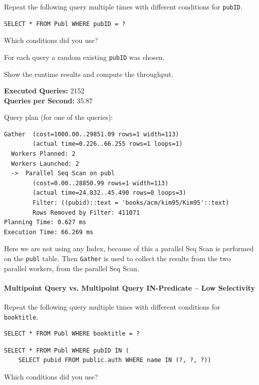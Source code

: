 \documentclass[11pt]{scrartcl}
\begin{document}
Repeat the following query multiple times with different conditions for \texttt{pubID}.

\begin{lstlisting}[style=dbtsql]
SELECT * FROM Publ WHERE pubID = ?
\end{lstlisting}

Which conditions did you use?

For each query a random existing \texttt{pubID} was chosen.

Show the runtime results and compute the throughput.

\textbf{Executed Queries: } 2152\\
\textbf{Queries per Second: } 35.87

Query plan (for one of the queries):

{\small
\parskip0pt\begin{verbatim}
Gather  (cost=1000.00..29851.09 rows=1 width=113)
        (actual time=0.226..66.255 rows=1 loops=1)
  Workers Planned: 2
  Workers Launched: 2
  ->  Parallel Seq Scan on publ
        (cost=0.00..28850.99 rows=1 width=113)
        (actual time=24.832..45.490 rows=0 loops=3)
        Filter: ((pubid)::text = 'books/acm/kim95/Kim95'::text)
        Rows Removed by Filter: 411071
Planning Time: 0.627 ms
Execution Time: 66.269 ms
\end{verbatim}}
Here we are not using any Index, because of this a parallel Seq Scan is performed on the \texttt{publ} table.
Then \texttt{Gather} is used to collect the results from the two parallel workers, from the parallel Seq Scan.
\cite{ParallelQueryDocumentation2024}

\paragraph{Multipoint Query vs. Multipoint Query IN-Predicate -- Low Selectivity}

Repeat the following query multiple times with different conditions for \texttt{booktitle}.

\begin{lstlisting}[style=dbtsql]
SELECT * FROM Publ WHERE booktitle = ?
\end{lstlisting}

\begin{lstlisting}[style=dbtsql]
SELECT * FROM Publ WHERE pubID IN (
    SELECT pubid FROM public.auth WHERE name IN (?, ?, ?))
\end{lstlisting}

Which conditions did you use?
\end{document}
